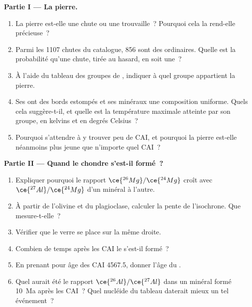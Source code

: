\begin{problem}
\medskip
\noindent\textbf{Partie I --- La pierre.}
\begin{enumerate}
  \item La pierre est-elle une chute ou une trouvaille~? Pourquoi cela la rend-elle précieuse~?
  \item Parmi les \num{1107} chutes du catalogue, 856 sont des  ordinaires. Quelle
        est la probabilité qu'une chute, tirée au hasard, en soit une~?
  \item À l'aide du tableau des groupes de , indiquer à quel groupe appartient la pierre.
  \item Ses  ont des bords estompés et ses minéraux une composition uniforme.
        Quels  cela suggère-t-il, et quelle est la température maximale
        atteinte par son groupe, en kelvins et en degrés Celsius~?
  \item Pourquoi s'attendre à y trouver peu de CAI, et pourquoi la pierre est-elle néanmoins
        plus jeune que n'importe quel CAI~?
\end{enumerate}

\noindent\textbf{Partie II --- Quand le chondre s'est-il formé~?}
\begin{enumerate}[resume]
  \item Expliquer pourquoi le rapport $\ce{^{26}Mg}/\ce{^{24}Mg}$ croît avec
        $\ce{^{27}Al}/\ce{^{24}Mg}$ d'un minéral à l'autre.
  \item À partir de l'olivine et du plagioclase, calculer la pente de l'isochrone.
        Que mesure-t-elle~?
  \item Vérifier que le verre se place sur la même droite.
  \item Combien de temps après les CAI le  s'est-il formé~?
  \item En prenant pour âge des CAI \qty{4567.5}{\Ma}, donner l'âge du .
  \item Quel aurait été le rapport $\ce{^{26}Al}/\ce{^{27}Al}$ dans un minéral formé
        \qty{10}{Ma} après les CAI~? Quel nucléide du tableau daterait mieux un tel
        événement~?
\end{enumerate}


\end{problem}
